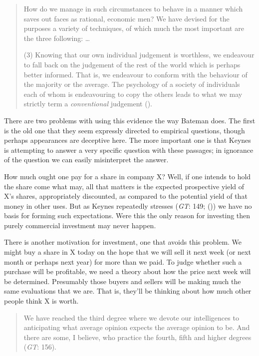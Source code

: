 \documentclass[
  10pt,
  letterpaper,
  DIV=11,
  numbers=noendperiod,
  twoside]{scrartcl}
\begin{document}
\begin{quote}
How do we manage in such circumstances to behave in a manner which saves
out faces as rational, economic men? We have devised for the purposes a
variety of techniques, of which much the most important are the three
following: \ldots{}

(3) Knowing that our own individual judgement is worthless, we endeavour
to fall back on the judgement of the rest of the world which is perhaps
better informed. That is, we endeavour to conform with the behaviour of
the majority or the average. The psychology of a society of individuals
each of whom is endeavouring to copy the others leads to what we may
strictly term a \emph{conventional} judgement
().
\end{quote}

There are two problems with using this evidence the way Bateman does.
The first is the old one that they seem expressly directed to empirical
questions, though perhaps appearances are deceptive here. The more
important one is that Keynes is attempting to answer a very specific
question with these passages; in ignorance of the question we can easily
misinterpret the answer.

How much ought one pay for a share in company X? Well, if one intends to
hold the share come what may, all that matters is the expected
prospective yield of X's shares, appropriately discounted, as compared
to the potential yield of that money in other uses. But as Keynes
repeatedly stresses (\emph{GT}: 149; ()) we have no basis for forming such expectations. Were this
the only reason for investing then purely commercial investment may
never happen.

There is another motivation for investment, one that avoids this
problem. We might buy a share in X today on the hope that we will sell
it next week (or next month or perhaps next year) for more than we paid.
To judge whether such a purchase will be profitable, we need a theory
about how the price next week will be determined. Presumably those
buyers and sellers will be making much the same evaluations that we are.
That is, they'll be thinking about how much other people think X is
worth.

\begin{quote}
We have reached the third degree where we devote our intelligences to
anticipating what average opinion expects the average opinion to be. And
there are some, I believe, who practice the fourth, fifth and higher
degrees (\emph{GT}: 156).
\end{quote}
\end{document}
